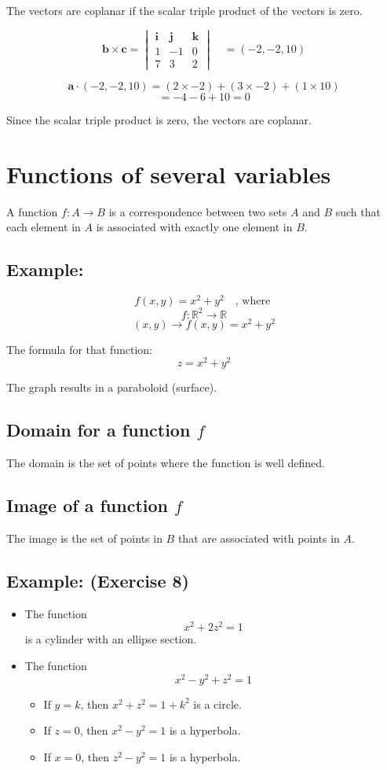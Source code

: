 \documentclass[11pt]{article}
\begin{document}
The vectors are coplanar if the scalar triple product of the vectors is zero.

\[
\mathbf{b} \times \mathbf{c} =
\begin{vmatrix}
\mathbf{i} & \mathbf{j} & \mathbf{k} \\
1 & -1 & 0 \\
7 & 3 & 2
\end{vmatrix}
\quad 
= (-2, -2, 10)
\]

\[
\mathbf{a} \cdot (-2, -2, 10) = (2 \times -2) + (3 \times -2) + (1 \times 10)
\]
\[
= -4 - 6 + 10 = 0
\]

Since the scalar triple product is zero, the vectors are coplanar.

\section{Functions of several variables}
A function $f : A \rightarrow B$ is a correspondence between two sets $A$ and $B$ such that each element in $A$ is associated with exactly one element in $B$.

\subsection*{Example:}
\[
f(x,y) = x^2 + y^2 \quad \text{, where }
\]
\[
f : \mathbb{R}^2 \rightarrow \mathbb{R}
\]
\[
(x,y) \rightarrow f(x,y) = x^2 + y^2
\]

The formula for that function:
\[
z = x^2 + y^2
\]

The graph results in a paraboloid (surface).

\subsection{Domain for a function $f$}
The domain is the set of points where the function is well defined.

\subsection{Image of a function $f$}
The image is the set of points in $B$ that are associated with points in $A$.

\subsection*{Example: (Exercise 8)}
\begin{itemize}
    \item The function \[ x^2 + 2z^2 = 1 \] is a cylinder with an ellipse section.
    \item The function \[ x^2 - y^2 + z^2 = 1 \]
    \begin{itemize}
        \item If $y = k$, then $x^2 + z^2 = 1 + k^2$ is a circle.
        \item If $z = 0$, then $x^2 - y^2 = 1$ is a hyperbola.
        \item If $x = 0$, then $z^2 - y^2 = 1$ is a hyperbola.
    \end{itemize}
\end{itemize}
\end{document}
